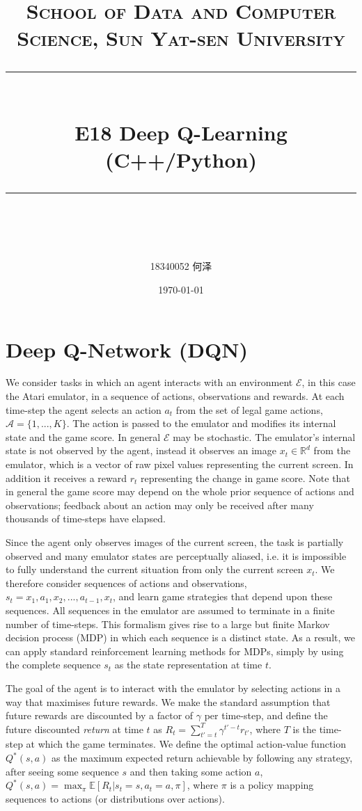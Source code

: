 \documentclass[a4paper, 11pt]{article}
\title{	
\normalfont \normalsize
\textsc{School of Data and Computer Science, Sun Yat-sen University} \\ [25pt] %
\rule{\textwidth}{0.5pt} \\[0.4cm] %
\huge  E18 Deep Q-Learning (C++/Python)\\ %
\rule{\textwidth}{2pt} \\[0.5cm] %
\author{18340052  何泽}
\date{\normalsize\today}
}
\begin{document}
\maketitle
\tableofcontents
\newpage

\section{Deep Q-Network (DQN) }
We consider tasks in which an agent interacts with an environment $\mathcal{E}$, in this case the Atari emulator, in a sequence of actions, observations and rewards. 
At each time-step the agent selects an action $a_t$ from the set of legal game actions, $\mathcal{A}=\{1, ..., K \}$. The action is passed to the emulator and modifies its internal state and the game score. In general $\mathcal{E}$ may be stochastic. The emulator's internal state is not observed by the agent,  instead it observes an image $x_t\in\mathbb{R}^d$ from the emulator, which is a vector of raw pixel values representing the current screen. In addition it receives a reward $r_t$ representing the change in game score. Note that in general the game score may depend on the whole prior sequence of actions and observations; feedback about an action may only be received after many thousands of time-steps have elapsed. 

Since the agent only observes images of the current screen, the task is partially observed and many emulator states are perceptually aliased, i.e. it is impossible to fully understand the current situation from only the current screen $x_t$. We therefore consider sequences of actions and observations, $s_t = {x_1, a_1, x_2, ..., a_{t-1}, x_t}$, and learn game strategies that depend upon these sequences. All sequences in the emulator are assumed to terminate in a finite number of time-steps. This formalism gives rise to a large but finite Markov decision process (MDP) in which each sequence is a distinct state. As a result, we can apply standard reinforcement learning methods for MDPs, simply by using the complete sequence $s_t$ as the state representation at time $t$.

The goal of the agent is to interact with the emulator by selecting actions in a way that maximises future rewards. We make the standard assumption that future rewards are discounted by a factor of $\gamma$ per time-step, and define the future discounted \emph{return} at time $t$ as $R_t = \sum_{t'=t}^{T} \gamma^{t'-t} r_{t'}$, where $T$
is the time-step at which the game terminates. We define the optimal action-value function $Q^*(s,a)$ as the maximum expected return achievable by following any strategy, after seeing some sequence $s$ and then taking some action $a$, $Q^*(s,a) = \max_{\pi} \mathbb E[R_t | s_t=s, a_t=a, \pi ]$, where $\pi$ is a policy mapping sequences to actions (or distributions over actions).
\end{document}
